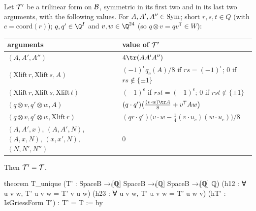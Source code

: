 \begin{theorem}\label{ch21:thm:Tunique}
Let $\mathcal{T}'$ be a trilinear form on $\mathcal{B}$, symmetric in its first two and in its last two
arguments, with the following values.  For $A,A',A''\in\mathrm{Sym}$; short $r,s,t\in Q$ (with
$c=\mathrm{coord}(r)$); $q,q'\in\Q^I$ and $v,w\in\Q^{24}$ (so $q\otimes v=qv^{\mathsf T}\in W$):
\begin{center}\small
\begin{tabular}{ll}
\toprule
arguments & value of $\mathcal{T}'$\\\midrule
$(A,A',A'')$ & $4\tr(AA'A'')$\\
$(\mathrm{Xlift}\,r,\mathrm{Xlift}\,s,A)$ & $(-1)^{\epsilon}q_c(A)/8$ if $rs=(-1)^\epsilon$; $0$ if $rs\notin\{\pm1\}$\\
$(\mathrm{Xlift}\,r,\mathrm{Xlift}\,s,\mathrm{Xlift}\,t)$ & $(-1)^\epsilon$ if $rst=(-1)^\epsilon$; $0$ if $rst\notin\{\pm1\}$\\
$(q\otimes v,q'\otimes w,A)$ & $(q\cdot q')\bigl(\tfrac{(v\cdot w)\tr A}8+v^{\mathsf T}Aw\bigr)$\\
$(q\otimes v,q'\otimes w,\mathrm{Xlift}\,r)$ & $(qr\cdot q')\bigl(v\cdot w-\tfrac14(v\cdot u_c)(w\cdot u_c)\bigr)/8$\\
$(A,A',x)$, $(A,A',N)$, $(A,x,N)$, $(x,x',N)$, $(N,N',N'')$ & $0$\\
\bottomrule
\end{tabular}
\end{center}
Then $\mathcal{T}'=\mathcal{T}$.
\end{theorem}
\begin{leancode}
theorem T_unique (T' : SpaceB →ₗ[ℚ] SpaceB →ₗ[ℚ] SpaceB →ₗ[ℚ] ℚ)
    (h12 : ∀ u v w, T' u v w = T' v u w) (h23 : ∀ u v w, T' u v w = T' u w v)
    (hT' : IsGriessForm T') : T' = T := by
\end{leancode}
